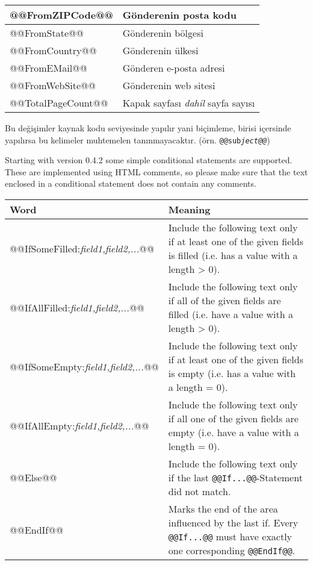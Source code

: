 \documentclass[a4paper,10pt]{scrartcl}
\begin{document}
\begin{center}
\begin{tabular}{|l|p{}|}
\ttfamily @@FromZIPCode@@ & Gönderenin posta kodu \\\hline
\ttfamily @@FromState@@ & Gönderenin bölgesi\\\hline
\ttfamily @@FromCountry@@ & Gönderenin ülkesi\\\hline
\ttfamily @@FromEMail@@ & Gönderen e-posta adresi\\\hline
\ttfamily @@FromWebSite@@ & Gönderenin web sitesi\\\hline
\ttfamily @@TotalPageCount@@ & Kapak sayfası \textit{dahil} sayfa sayısı\\\hline
\end{tabular}
\end{center}

Bu değişimler kaynak kodu seviyesinde yapılır yani biçimleme, birisi içersinde yapılırsa bu kelimeler muhtemelen tanınmayacaktır. (örn. \texttt{@@sub\textit{ject@@}})

Starting with version 0.4.2 some simple conditional statements are supported. These are implemented using HTML comments, so please make sure that the text enclosed in a conditional statement does not contain any comments.
\begin{center}
\begin{tabular}{|l|p{}|}
\hline
\bfseries Word & \bfseries Meaning \\
\hline\hline
\ttfamily @@IfSomeFilled:\textit{field1,field2,...}@@ & Include the following text only if at least one of the given fields is filled (i.e. has a value with a length > 0).\\\hline
\ttfamily @@IfAllFilled:\textit{field1,field2,...}@@ & Include the following text only if all of the given fields are filled (i.e. have a value with a length > 0).\\\hline
\ttfamily @@IfSomeEmpty:\textit{field1,field2,...}@@ & Include the following text only if at least one of the given fields is empty (i.e. has a value with a length = 0).\\\hline
\ttfamily @@IfAllEmpty:\textit{field1,field2,...}@@ & Include the following text only if all one of the given fields are empty (i.e. have a value with a length = 0).\\\hline
\ttfamily @@Else@@ & Include the following text only if the last \texttt{@@If...@@}-Statement did not match.\\\hline
\ttfamily @@EndIf@@ & Marks the end of the area influenced by the last if. Every \texttt{@@If...@@} must have exactly one corresponding \texttt{@@EndIf@@}.\\\hline
\end{tabular}
\end{center}
\end{document}
